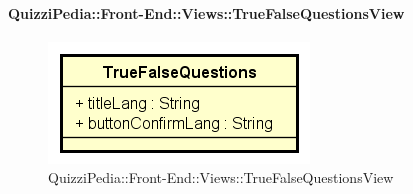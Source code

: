 \paragraph{QuizziPedia::Front-End::Views::TrueFalseQuestionsView}
\begin{figure} [ht]
	\centering
	\includegraphics[scale=0.45]{UML/Classi/Front-End/QuizziPedia_Front-end_Views_TrueFalseQuestionsView.png}
	\caption{QuizziPedia::Front-End::Views::TrueFalseQuestionsView}
\end{figure} \FloatBarrier
